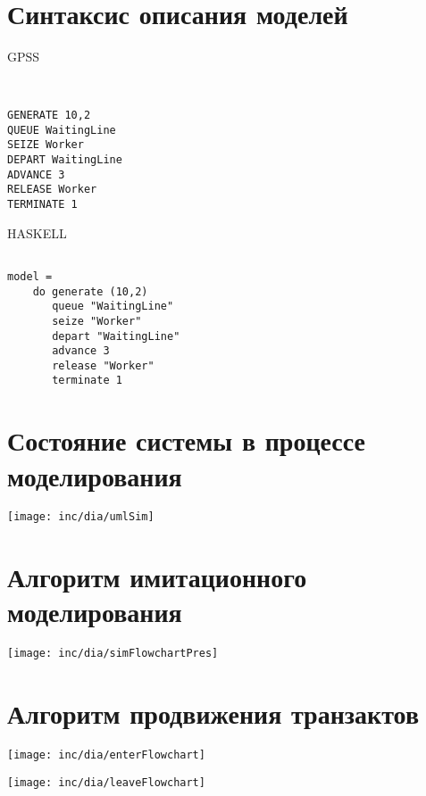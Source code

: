 \documentclass[12pt]{article}
\begin{document}
\section{Синтаксис описания моделей}

\begin{minipage}[m]{.49\textwidth}
\centerline{GPSS}

\begin{verbatim}


GENERATE 10,2
QUEUE WaitingLine
SEIZE Worker
DEPART WaitingLine
ADVANCE 3
RELEASE Worker
TERMINATE 1

\end{verbatim}


\end{minipage}
%
\begin{minipage}[m]{.49\textwidth}
\vspace{1cm}
\centerline{HASKELL}

\begin{verbatim}

model = 
    do generate (10,2)
       queue "WaitingLine"
       seize "Worker"
       depart "WaitingLine"
       advance 3
       release "Worker"
       terminate 1

\end{verbatim}

\end{minipage}


\section{Состояние системы в процессе моделирования}

\texttt{[image: inc/dia/umlSim]}


\section{Алгоритм имитационного моделирования}
\centering
\texttt{[image: inc/dia/simFlowchartPres]}

\section{Алгоритм продвижения транзактов}
\begin{minipage}[m]{.49\textwidth}
\texttt{[image: inc/dia/enterFlowchart]}
\end{minipage}
\begin{minipage}[m]{.49\textwidth}
\texttt{[image: inc/dia/leaveFlowchart]}
\end{minipage}
\end{document}
